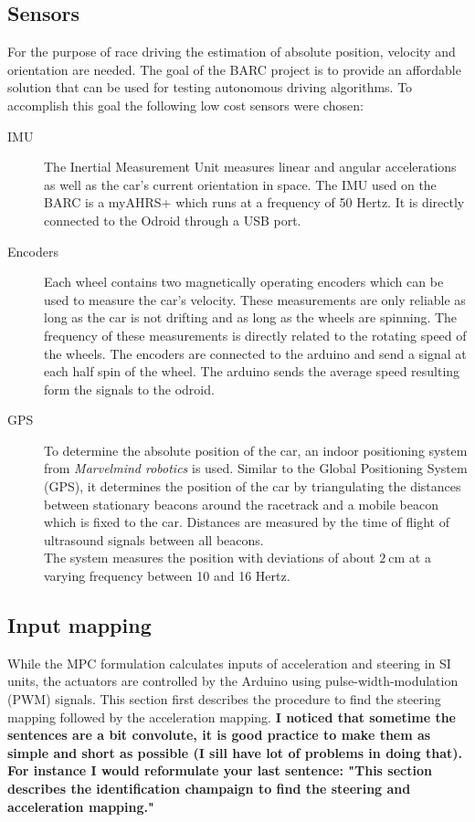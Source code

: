 \subsection{Sensors}
For the purpose of race driving the estimation of absolute position, velocity and orientation are needed. The goal of the BARC project is to provide an affordable solution that can be used for testing autonomous driving algorithms. To accomplish this goal the following low cost  sensors were chosen:
\begin{description}
\item[IMU] The Inertial Measurement Unit measures linear and angular accelerations as well as the car's current orientation in space. The IMU used on the BARC is a myAHRS+ which runs at a frequency of 50 Hertz. It is directly connected to the Odroid through a USB port.
\item[Encoders] Each wheel contains two magnetically operating encoders which can be used to measure the car's velocity. These measurements are only reliable as long as the car is not drifting and as long as the wheels are spinning. The frequency of these measurements is directly related to the rotating speed of the wheels. The encoders are connected to the arduino and send a signal at each half spin of the wheel. The arduino sends the average speed resulting form the signals to the odroid.
\item[GPS] To determine the absolute position of the car, an indoor positioning system from \emph{Marvelmind robotics} \cite{marvelmind} is used. Similar to the Global Positioning System (GPS), it determines the position of the car by triangulating the distances between stationary beacons around the racetrack and a mobile beacon which is fixed to the car. Distances are measured by the time of flight of ultrasound signals between all beacons.\\
The system measures the position with deviations of about $\SI{2}{\centi\meter}$ at a varying frequency between 10 and 16 Hertz.
\end{description}

\subsection{Input mapping}\label{sec:inputMapping}
While the MPC formulation calculates inputs of acceleration and steering in SI units, the actuators are controlled by the Arduino using pulse-width-modulation (PWM) signals. This section first describes the procedure to find the steering mapping followed by the acceleration mapping. {\bfseries{I noticed that sometime the sentences are a bit convolute, it is good practice to make them as simple and short as possible (I sill have lot of problems in doing that). For instance I would reformulate your last sentence: "This section describes the identification champaign to find the steering and acceleration mapping."}}
